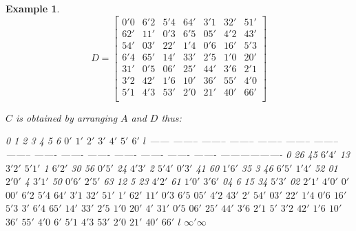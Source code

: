 \documentclass[
  11pt,
  a4paper]{book}
\newtheorem{example}{Example}
\begin{document}
\begin{example}
\begin{equation}
  D = \begin{bmatrix}
      0'0 & 6'2 & 5'4 & 64' & 3'1 & 32' & 51'  \\
      62' & 11' & 0'3 & 6'5 & 05' & 4'2 & 43'  \\
      54' & 03' & 22' & 1'4 & 0'6 & 16' & 5'3  \\
      6'4 & 65' & 14' & 33' & 2'5 & 1'0 & 20'  \\
      31' & 0'5 & 06' & 25' & 44' & 3'6 & 2'1  \\
      3'2 & 42' & 1'6 & 10' & 36' & 55' & 4'0  \\
      5'1 & 4'3 & 53' & 2'0 & 21' & 40' & 66'  \\
  \end{bmatrix}
\end{equation}

$C$ is obtained by arranging $A$ and $D$ thus:

            0        1        2        3        4        5        6      $0'$    $1'$    $2'$    $3'$    $4'$    $5'$    $6'$           $l$
  ------ -------- -------- -------- -------- -------- -------- -------- ------- ------- ------- ------- ------- ------- ------- -------------------
    0                26       45     $6'4'$     13     $3'2'$   $5'1'$                                                          
    1     $6'2'$              30       56     $0'5'$     24     $4'3'$                                                          
    2     $5'4'$   $0'3'$              41       60     $1'6'$     35                                                            
    3       46     $6'5'$   $1'4'$              52       01     $2'0'$                                                          
    4     $3'1'$     50     $0'6'$   $2'5'$              63       12                                                            
    5       23     $4'2'$     61     $1'0'$   $3'6'$              04                                                            
    6       15       34     $5'3'$     02     $2'1'$   $4'0'$                                                                   
   $0'$                                                                  $00'$   $6'2$   $5'4$   $64'$   $3'1$   $32'$   $51'$  
   $1'$                                                                  $62'$   $11'$   $0'3$   $6'5$   $05'$   $4'2$   $43'$  
   $2'$                                                                  $54'$   $03'$   $22'$   $1'4$   $0'6$   $16'$   $5'3$  
   $3'$                                                                  $6'4$   $65'$   $14'$   $33'$   $2'5$   $1'0$   $20'$  
   $4'$                                                                  $31'$   $0'5$   $06'$   $25'$   $44'$   $3'6$   $2'1$  
   $5'$                                                                  $3'2$   $42'$   $1'6$   $10'$   $36'$   $55'$   $4'0$  
   $6'$                                                                  $5'1$   $4'3$   $53'$   $2'0$   $21'$   $40'$   $66'$  
   $l$                                                                                                                           $\infty ' \infty$


\end{example}
\end{document}
